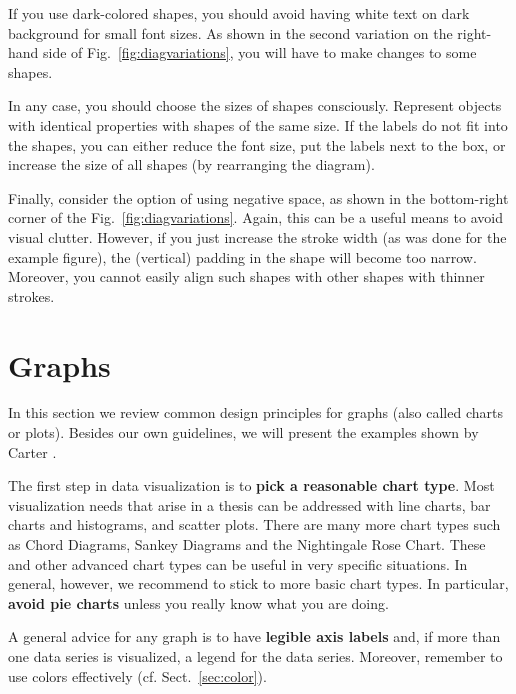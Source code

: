 If you use dark-colored shapes, you should avoid having white text on dark background for small font sizes. As shown in the second variation on the right-hand side of Fig.~\ref{fig:diagvariations}, you will have to make changes to some shapes.

In any case, you should choose the sizes of shapes consciously. Represent objects with identical properties with shapes of the same size. If the labels do not fit into the shapes, you can either reduce the font size, put the labels next to the box, or increase the size of all shapes (by rearranging the diagram).

Finally, consider the option of using negative space, as shown in the bottom-right corner of the Fig.~\ref{fig:diagvariations}. Again, this can be a useful means to avoid visual clutter. However, if you just increase the stroke width (as was done for the example figure), the (vertical) padding in the shape will become too narrow. Moreover, you cannot easily align such shapes with other shapes with thinner strokes.


\section{Graphs}

In this section we review common design principles for graphs (also called charts or plots). Besides our own guidelines, we will present the examples shown by Carter \cite{Carter12}.

The first step in data visualization is to \textbf{pick a reasonable chart type}. Most visualization needs that arise in a thesis can be addressed with line charts, bar charts and histograms, and scatter plots. There are many more chart types such as Chord Diagrams, Sankey Diagrams and the Nightingale Rose Chart.
These and other advanced chart types can be useful in very specific situations. In general, however, we recommend to stick to more basic chart types. In particular, \textbf{avoid pie charts} unless you really know what you are doing.

A general advice for any graph is to have \textbf{legible axis labels} and, if more than one data series is visualized, a legend for the data series. Moreover, remember to use colors effectively (cf. Sect.~\ref{sec:color}).

